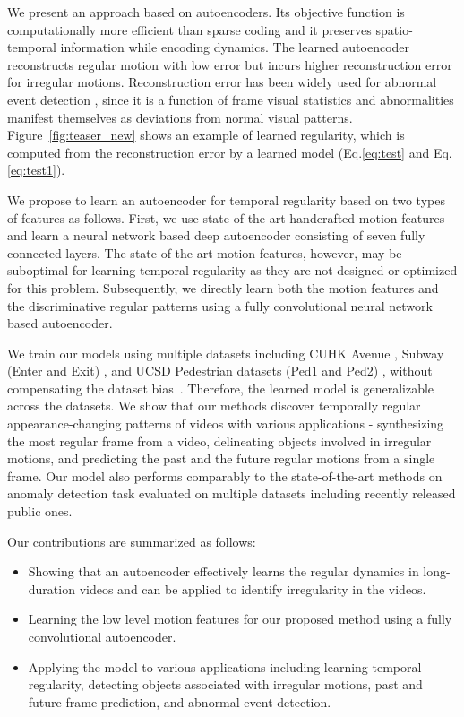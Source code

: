 \documentclass[10pt,twocolumn,letterpaper]{article}
\begin{document}
We present an approach based on autoencoders. 
Its objective function is computationally more efficient than sparse coding and it preserves spatio-temporal information while encoding dynamics.
The learned autoencoder reconstructs regular motion with low error but incurs higher reconstruction error for irregular motions.
Reconstruction error has been widely used for abnormal event detection \cite{popoola2012video}, since it is a function of frame visual statistics and abnormalities manifest themselves as deviations from normal visual patterns.
Figure~\ref{fig:teaser_new} shows an example of learned regularity, which is computed from the reconstruction error by a learned model (Eq.\ref{eq:test} and Eq.\ref{eq:test1}).

We propose to learn an autoencoder for temporal regularity based on two types of features as follows.
First, we use state-of-the-art handcrafted motion features and learn a neural network based deep autoencoder consisting of seven fully connected layers.
The state-of-the-art motion features, however, may be suboptimal for learning temporal regularity as they are not designed or optimized for this problem.
Subsequently, we directly learn both the motion features and the discriminative regular patterns using a fully convolutional neural network based autoencoder. 


We train our models using multiple datasets including CUHK Avenue \cite{lu2013abnormal}, Subway (Enter and Exit) \cite{adam2008robust}, and UCSD Pedestrian datasets (Ped1 and Ped2) \cite{mahadevan2010anomaly}, without compensating the dataset bias~\cite{torralbaEfros11}. 
Therefore, the learned model is generalizable across the datasets. 
We show that our methods discover temporally regular appearance-changing patterns of videos with various applications - synthesizing the most regular frame from a video, delineating objects involved in irregular motions, and predicting the past and the future regular motions from a single frame. 
Our model also performs comparably to the state-of-the-art methods on anomaly detection task evaluated on multiple datasets including recently released public ones. 

Our contributions are summarized as follows:
\vspace{-2mm}
\begin{itemize}
	\setlength{\itemsep}{-3pt}
	\item Showing that an autoencoder effectively learns the regular dynamics in long-duration videos and can be applied to identify irregularity in the videos.
	\item Learning the low level motion features for our proposed method using a fully convolutional autoencoder.
	\item Applying the model to various applications including learning temporal regularity, detecting objects associated with irregular motions, past and future frame prediction, and abnormal event detection.
\end{itemize}
\vspace{-2mm}
\end{document}
